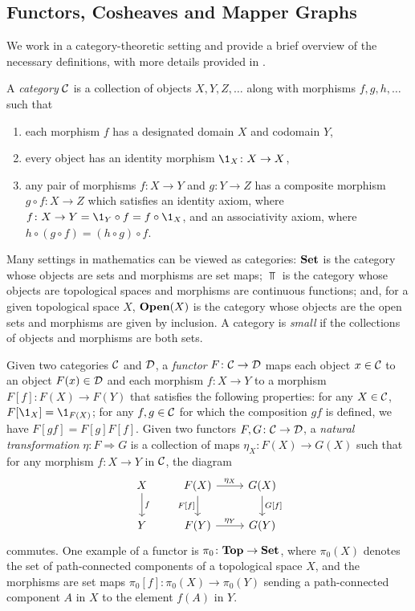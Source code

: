 \subsection{Functors, Cosheaves and Mapper Graphs}
\label{sec:CategoryTheory}

We work in a category-theoretic setting and provide a brief overview of the necessary definitions, with more details provided in \cite{curry2013sheaves,riehl2017category}. 

A \emph{category} $\mathcal{C}$ is a collection of objects $X,Y,Z,\dots$ along with morphisms $f,g,h,\dots$ such that 
\begin{enumerate}
    \item each morphism $f$ has a designated domain $X$ and codomain $Y$,
    \item every object has an identity morphism $\1_X\colon X \to X$,
    \item any pair of morphisms $f\colon X \to Y$ and $g\colon Y \to Z$ has a composite morphism $g \circ  f\colon X \to Z$ which satisfies an identity axiom, where $f\colon X \to Y = \1_Y \circ  f = f \circ \1_X$, and an associativity axiom, where $h\circ (g\circ f) = (h\circ g)\circ f$.
  \end{enumerate}
Many settings in mathematics can be viewed as categories: $\mathbf{Set}$ is the category whose objects are sets and morphisms are set maps; 
$\Top$ is the category whose objects are topological spaces and morphisms are continuous functions;
and, for a given topological space $X$, $\mathbf{Open}(X)$ is the category whose objects are the open sets and morphisms are given by inclusion. A category is \emph{small} if the collections of objects and morphisms are both sets.

Given two categories $\mathcal{C}$ and $\mathcal{D}$, a \emph{functor} $F\colon\mathcal{C} \to \mathcal{D}$ maps each object $x \in \mathcal{C}$ to an object $F(x) \in \mathcal{D}$ and each morphism $f\colon X \to Y$ to a morphism $F[f]\colon F(X) \to F(Y)$ that satisfies the following properties: for any $X \in \mathcal{C}$, $F[\1_X] = \1_{F(X)}$; for any $f,g \in \mathcal{C}$ for which the composition $gf$ is defined, we have $F[gf] = F[g] F[f]$. 
Given two functors $F,G\colon \mathcal{C} \to \mathcal{D}$, a \emph{natural transformation} $\eta\colon F \Rightarrow G$ is a collection of maps $\eta_X\colon F(X) \to G(X)$ such that for any morphism $f\colon X \to Y$ in $\mathcal{C}$, the diagram 
\begin{equation*}
\begin{tikzcd}
X\ar[d,  "f"] 
& F(X) 
    \ar[r, "\eta_X"] 
    \ar[d, "{F[f]}"']
& G(X) 
    \ar[d, "{G[f]}"]
\\
Y 
& F(Y) \ar[r, "\eta_Y"] 
& G(Y)
\end{tikzcd}
\end{equation*}
commutes. 
One example of a functor is $\pi_0\colon\mathbf{Top} \to \mathbf{Set}$, where $\pi_0(X)$ denotes the set of path-connected components of a topological space $X$, and the morphisms are set maps $\pi_0[f]\colon \pi_0(X) \to \pi_0(Y)$ sending a path-connected component $A$ in $X$ to the element $f(A)$ in $Y$.

